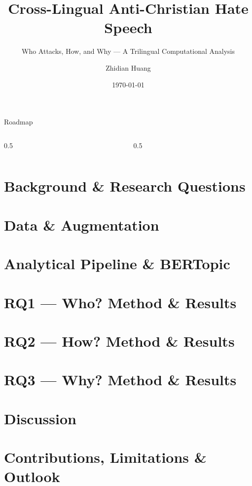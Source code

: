 \documentclass[aspectratio=169,10pt]{beamer}
\title{Cross-Lingual Anti-Christian Hate Speech}
\subtitle{Who Attacks, How, and Why --- A Trilingual Computational Analysis}
\author{Zhidian Huang}
\institute{Department of Computational Linguistics \textperiodcentered\ University of Zurich}
\date{\today}
\begin{document}

\begin{frame}[plain]
  \titlepage
\end{frame}

\begin{frame}{Roadmap}
  \begin{columns}[t]
    \begin{column}{0.5\textwidth}
      \tableofcontents[sections={1-3}, hideallsubsections]
    \end{column}
    \begin{column}{0.5\textwidth}
      \tableofcontents[sections={4-8}, hideallsubsections]
    \end{column}
  \end{columns}
\end{frame}

\section{Background \& Research Questions}
\section{Data \& Augmentation}
\section{Analytical Pipeline \& BERTopic}
\section{RQ1 --- Who? Method \& Results}
\section{RQ2 --- How? Method \& Results}
\section{RQ3 --- Why? Method \& Results}
\section{Discussion}
\section{Contributions, Limitations \& Outlook}
\end{document}
